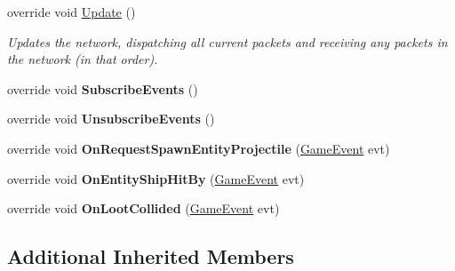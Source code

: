 \begin{DoxyCompactItemize}
override void \hyperlink{class_skyrates_1_1_client_1_1_network_1_1_dummy_client_a293ecc1918e24e8da6002a2491277333}{Update} ()
\begin{DoxyCompactList}\small\item\em Updates the network, dispatching all current packets and receiving any packets in the network (in that order). \end{DoxyCompactList}\item 
\hypertarget{class_skyrates_1_1_client_1_1_network_1_1_dummy_client_aa917662499560c267709d5704f2cdfb1}{override void {\bfseries Subscribe\-Events} ()}\label{class_skyrates_1_1_client_1_1_network_1_1_dummy_client_aa917662499560c267709d5704f2cdfb1}

\item 
\hypertarget{class_skyrates_1_1_client_1_1_network_1_1_dummy_client_a369ccdfe91669af037a8aaf2ea4a8aae}{override void {\bfseries Unsubscribe\-Events} ()}\label{class_skyrates_1_1_client_1_1_network_1_1_dummy_client_a369ccdfe91669af037a8aaf2ea4a8aae}

\item 
\hypertarget{class_skyrates_1_1_client_1_1_network_1_1_dummy_client_a5102783742554da1eb2e0fd89af34ab7}{override void {\bfseries On\-Request\-Spawn\-Entity\-Projectile} (\hyperlink{class_skyrates_1_1_client_1_1_game_1_1_event_1_1_game_event}{Game\-Event} evt)}\label{class_skyrates_1_1_client_1_1_network_1_1_dummy_client_a5102783742554da1eb2e0fd89af34ab7}

\item 
\hypertarget{class_skyrates_1_1_client_1_1_network_1_1_dummy_client_ae43c30a66d4bde821a82702ec26adafa}{override void {\bfseries On\-Entity\-Ship\-Hit\-By} (\hyperlink{class_skyrates_1_1_client_1_1_game_1_1_event_1_1_game_event}{Game\-Event} evt)}\label{class_skyrates_1_1_client_1_1_network_1_1_dummy_client_ae43c30a66d4bde821a82702ec26adafa}

\item 
\hypertarget{class_skyrates_1_1_client_1_1_network_1_1_dummy_client_a1ca4a5e98b0be1ebe674345380debcc9}{override void {\bfseries On\-Loot\-Collided} (\hyperlink{class_skyrates_1_1_client_1_1_game_1_1_event_1_1_game_event}{Game\-Event} evt)}\label{class_skyrates_1_1_client_1_1_network_1_1_dummy_client_a1ca4a5e98b0be1ebe674345380debcc9}

\end{DoxyCompactItemize}
\subsection*{Additional Inherited Members}


